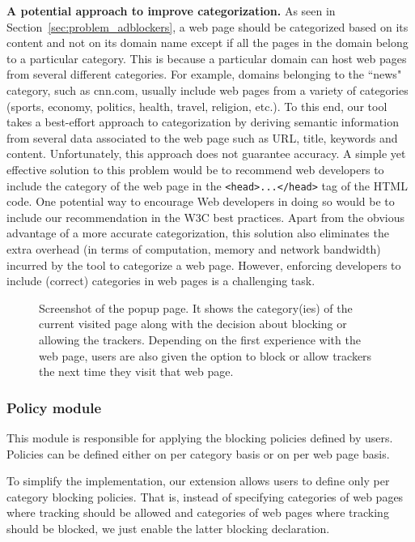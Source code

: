 \documentclass[conference]{IEEEtran}
\begin{document}
\textbf{A potential approach to improve categorization.}
As seen in Section~\ref{sec:problem_adblockers}, a web page should be categorized based on its content and not on its domain name except if all the pages in the domain belong to a particular category.
This is because a particular domain can host web pages from several different categories.
For example, domains belonging to the ``news" category, such as cnn.com, usually include web pages from a variety of categories (sports, economy, politics, health, travel, religion, etc.).
To this end, our tool takes a best-effort approach to categorization by deriving semantic information from several data associated to the web page such as URL, title, keywords and content.
Unfortunately, this approach does not guarantee accuracy.
A simple yet effective solution to this problem would be to recommend web developers to include the category of the web page in the \texttt{<head>...</head>} tag of the HTML code.
One potential way to encourage Web developers in doing so would be to include our recommendation in the W3C best practices.
Apart from the obvious advantage of a more accurate categorization, this solution also eliminates the extra overhead (in terms of computation, memory and network bandwidth) incurred by the tool to categorize a web page.
However, enforcing developers to include (correct) categories in web pages is a challenging task.







\begin{figure}[t]
\centering
{}
\caption{Screenshot of the popup page. It shows the category(ies) of the current visited page along with the decision about blocking or allowing the trackers.
Depending on the first experience with the web page, users are also given the option to block or allow trackers the next time they visit that web page.}
\label{fig:screenshot}
\end{figure}




\subsubsection{Policy module}
This module is responsible for applying the blocking policies defined by users.
Policies can be defined either on per category basis or on per web page basis.

To simplify the implementation, our extension allows users to define only per category blocking policies.
That is, instead of specifying categories of web pages where tracking should be allowed and categories of web pages where tracking should be blocked, we just enable the latter blocking declaration.
\end{document}
